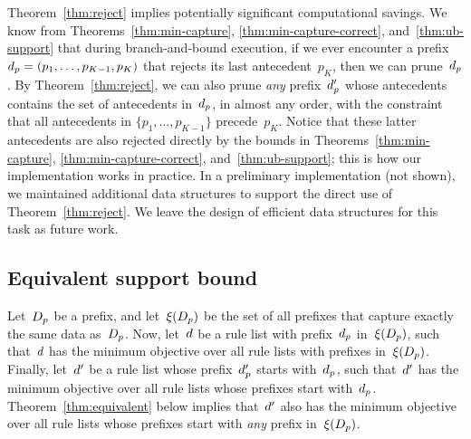 \begin{arxiv}
Theorem~\ref{thm:reject} implies potentially significant
computational savings.
%
We know from Theorems~\ref{thm:min-capture},
\ref{thm:min-capture-correct}, and~\ref{thm:ub-support}
that during branch-and-bound execution, if we ever encounter a
prefix ${d_p = (p_1, \dots, p_{K-1}, p_K)}$ that rejects its
last antecedent~$p_K$, then we can prune~$d_p$.
%
By Theorem~\ref{thm:reject}, we can also prune \emph{any} prefix~$d_p'$
whose antecedents contains the set of antecedents in~$d_p$,
in almost any order, with the constraint that all antecedents
in ${\{p_1, \dots, p_{K-1}\}}$ precede~$p_K$.
%
Notice that these latter antecedents are also rejected
directly by the bounds in Theorems~\ref{thm:min-capture},
\ref{thm:min-capture-correct}, and~\ref{thm:ub-support};
this is how our implementation works in practice.
%
In a preliminary implementation (not shown), we maintained additional
data structures to support the direct use of Theorem~\ref{thm:reject}.
%
We leave the design of efficient data structures for this task as future work.

\end{arxiv}

\subsection{Equivalent support bound}
\label{sec:equivalent}

Let~$D_p$ be a prefix, and let~$\xi(D_p)$ be the set
of all prefixes that capture exactly the same data as~$D_p$.
%
Now, let~${d}$ be a rule list with prefix~$d_p$
in~$\xi(D_p)$, such that~${d}$ has the minimum objective
over all rule lists with prefixes in~$\xi(D_p)$.
%
Finally, let~${d}'$ be a rule list whose prefix~$d_p'$
starts with~$d_p$, such that~${d}'$ has the minimum objective
over all rule lists whose prefixes start with~$d_p$.
%
Theorem~\ref{thm:equivalent} below implies that~${d}'$ also has
the minimum objective over all rule lists whose prefixes start with
\emph{any} prefix in~$\xi(D_p)$.

